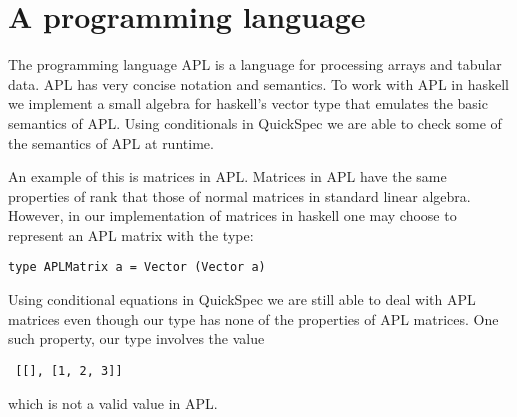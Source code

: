 \section{A programming language}
The programming language APL %
is a language for processing arrays and tabular data.
APL has very concise notation and semantics.
To work with APL in haskell we implement a small
algebra for haskell's vector type %
that emulates the basic semantics of APL.
Using conditionals in QuickSpec we are able to check some of
the semantics of APL at runtime.

An example of this is matrices in APL. Matrices in APL
have the same properties of rank that those of normal
matrices in standard linear algebra. However, in our implementation
of matrices in haskell one may choose to represent an APL matrix with
the type:
\begin{verbatim}type APLMatrix a = Vector (Vector a)\end{verbatim}
Using conditional equations in QuickSpec we are still able to deal with
APL matrices even though our type has none of the properties of APL matrices.
One such property, our type involves the value \begin{verbatim} [[], [1, 2, 3]] \end{verbatim}
which is not a valid value in APL.

